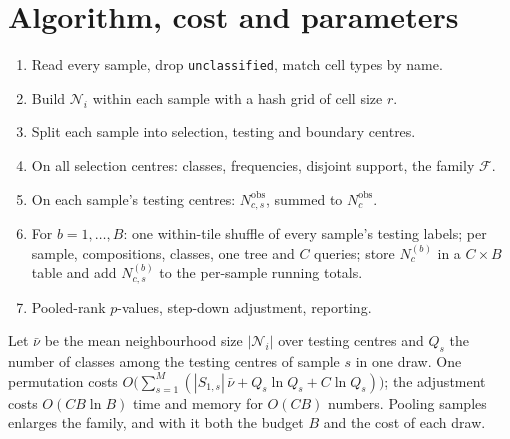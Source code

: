 \documentclass[11pt,a4paper]{article}
\theoremstyle{remark}
\newcommand{\obs}{\mathrm{obs}}
\newcommand{\Nb}[1]{\mathcal{N}_{#1}}
\begin{document}
\section{Algorithm, cost and parameters}
\label{sec:algo}

\begin{enumerate}[itemsep=2pt]
  \item Read every sample, drop \texttt{unclassified}, match cell types by name.
  \item Build $\Nb{i}$ within each sample with a hash grid of cell size $r$.
  \item Split each sample into selection, testing and boundary centres.
  \item On all selection centres: classes, frequencies, disjoint support, the
        family $\mathcal F$.
  \item On each sample's testing centres: $N^{\obs}_{c,s}$, summed to $N^{\obs}_c$.
  \item For $b=1,\dots,B$: one within-tile shuffle of every sample's testing
        labels; per sample, compositions, classes, one tree and $C$ queries;
        store $N^{(b)}_c$ in a $C\times B$ table and add $N^{(b)}_{c,s}$ to the
        per-sample running totals.
  \item Pooled-rank $p$-values, step-down adjustment, reporting.
\end{enumerate}

Let $\bar\nu$ be the mean neighbourhood size $|\Nb{i}|$ over testing centres
and $Q_s$ the number of classes among the testing centres of sample $s$ in
one draw. One permutation costs
$O\bigl(\sum_{s=1}^M(|S_{1,s}|\,\bar\nu+Q_s\ln Q_s+C\ln Q_s)\bigr)$; the
adjustment costs $O(CB\ln B)$ time and memory for $O(CB)$ numbers. Pooling
samples enlarges the family, and with it both the budget $B$ and the cost of
each draw.
\end{document}
